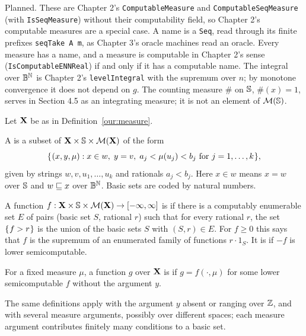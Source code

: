 \begin{formalization}
Planned. These are Chapter 2's \texttt{ComputableMeasure} and \texttt{ComputableSeqMeasure}
(with \texttt{IsSeqMeasure}) without their computability field, so Chapter 2's computable
measures are a special case. A name is a \texttt{Seq}, read through its finite prefixes
\texttt{seqTake A m}, as Chapter 3's oracle machines read an oracle. Every measure has a name,
and a measure is computable in Chapter 2's sense (\texttt{IsComputableENNReal}) if and only if it
has a computable name. The integral over $\mathbb{B}^{\mathbb{N}}$ is Chapter 2's \texttt{levelIntegral} with
the supremum over $n$; by monotone convergence it does not depend on $g$. The counting measure
$\#$ on $\mathbb{S}$, $\#(x) = 1$, serves in Section 4.5 as an integrating measure; it is not an element
of $\mathcal{M}(\mathbb{S})$.
\end{formalization}

\begin{ourdefinition}\label{our:lsc}
Let \( \mathbf{X} \) be as in Definition~\ref{our:measure}.
 \begin{alphenum}
  \item A  is a subset of \( \mathbf{X}\times\mathbb{S}\times\mathcal{M}(\mathbf{X}) \) of the form
 \[
  \mathopen\{\mskip 1mu(x,y,\mu) : x\in w,\; y = v,\; a_{j} < \mu(u_{j}) < b_{j} \text{ for } j=1,\dots,k\mskip 1mu\mathclose\},
 \]
given by strings \( w,v,u_{1},\dots,u_{k} \) and rationals \( a_{j}<b_{j} \).
Here \( x\in w \) means \( x = w \) over \( \mathbb{S} \) and \( w\sqsubseteq x \) over \( \mathbb{B}^{\mathbb{N}} \).
Basic sets are coded by natural numbers.
  \item A function \( f:\mathbf{X}\times\mathbb{S}\times\mathcal{M}(\mathbf{X})\to[-\infty,\infty] \) is  if there is a computably enumerable set \( E \) of pairs (basic set \( S \),
rational \( r \)) such that for every rational \( r \), the set \( \mathopen\{\mskip 1mu f>r\mskip 1mu\mathclose\} \) is the union of
the basic sets \( S \) with \( (S,r)\in E \).
For \( f\ge 0 \) this says that \( f \) is the supremum of an enumerated family of functions
\( r\cdot 1_{S} \).
It is  if \( -f \) is lower semicomputable.
  \item For a fixed measure \( \mu \), a function \( g \) over \( \mathbf{X} \) is
 if \( g = f(\cdot,\mu) \) for some lower semicomputable
\( f \) without the argument \( y \).
  \item The same definitions apply with the argument \( y \) absent or ranging over \( \mathbb{Z} \),
and with several measure arguments, possibly over different spaces; each measure argument
contributes finitely many conditions to a basic set.
 \end{alphenum}
\end{ourdefinition}

